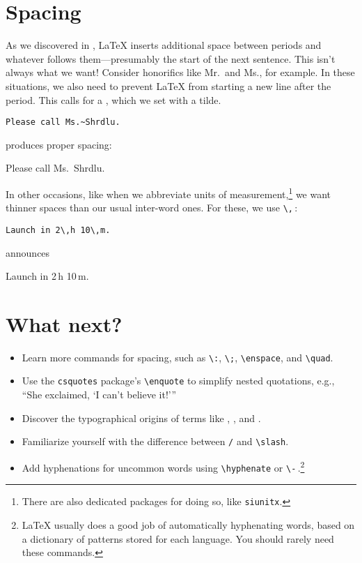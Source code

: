 \section{Spacing}

As we discovered in ,
\LaTeX{} inserts additional space between periods and whatever
follows them---presumably the start of the next sentence.
This isn't always what we want!
Consider honorifics like Mr.\ and Ms., for example.
In these situations, we also need to prevent \LaTeX{} from starting a
new line after the period.
This calls for a , which we set with a tilde.
\begin{leftfigure}
\begin{lstlisting}
Please call Ms.~Shrdlu.
\end{lstlisting}
\end{leftfigure}
produces proper spacing:
\begin{leftfigure}
\lm%
Please call Ms.~Shrdlu.
\end{leftfigure}

In other occasions, like when we abbreviate units of
measurement,\punckern\footnote{There are also dedicated packages for doing so,
like \texttt{siunitx}.}
we want thinner spaces than our usual inter-word ones.
For these, we use \verb|\,|\,:
\begin{leftfigure}
\begin{lstlisting}
Launch in 2\,h 10\,m.
\end{lstlisting}
\end{leftfigure}
announces
\begin{leftfigure}
\lm%
Launch in 2\,h 10\,m.
\end{leftfigure}

\section{What next?}
\begin{itemize}
\item Learn more commands for spacing, such as \verb|\:|, \verb|\;|,
    \verb|\enspace|, and \verb|\quad|.
\item Use the \texttt{csquotes} package's \verb|\enquote| to simplify
    nested quotations, e.g., \\
    \enquote{She exclaimed, \enquote{I can't believe it!}}
\item Discover the typographical origins of terms like ,
    , and .
\item Familiarize yourself with the difference between \texttt{/} and
    \verb|\slash|.
\item Add hyphenations for uncommon words using \verb|\hyphenate|
    or \verb|\-|\,.\punckern\footnote{\LaTeX{} usually does a good
    job of automatically hyphenating words, based on a dictionary of patterns
    stored for each language. You should rarely need these commands.}
\end{itemize}
